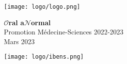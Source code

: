 \thispagestyle{empty}


\begin{center}
\texttt{[image: logo/logo.png]}
\vspace{4cm}

\Huge {\bf $\mathcal{O}$ral a$\mathcal{N}$ormal}\\[2cm]
\huge
Promotion Médecine-Sciences 2022-2023\\[1cm]
Mars 2023
\end{center}
\vspace{4cm}

\begin{center}
\texttt{[image: logo/ibens.png]}
\end{center}